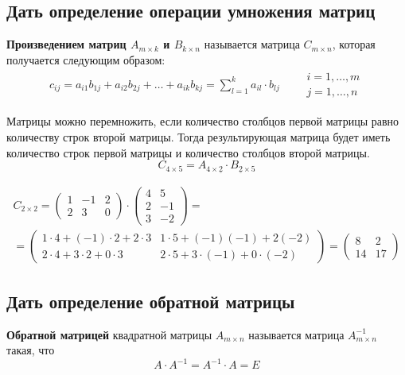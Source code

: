 \subsection{Дать определение операции умножения матриц}
\begin{definition*}
	\textbf{Произведением матриц $A_{m\times k}$ и $B_{k\times n}$} называется матрица $C_{m\times n}$, которая получается следующим образом:
	\begin{gather*}
		c_{ij} = a_{i1} b_{1j} + a_{i2}b_{2j} + \ldots + a_{ik} b_{kj} = \sum^k_{l=1} a_{il} \cdot b_{lj} \qquad \begin{array}{l} i = 1, \ldots , m \\ j = 1, \ldots , n \end{array}
	\end{gather*}
\end{definition*}
\begin{remark}
	Матрицы можно перемножить, если количество столбцов первой матрицы равно количеству строк второй матрицы. Тогда результирующая матрица будет иметь количество строк первой матрицы и количество столбцов второй матрицы.
	\[C_{4 \times 5} = A_{4 \times \underline{2}} \cdot B_{\underline{2} \times 5} \]
\end{remark}
\newpage
\begin{eg}
	\begin{gather*}
		C_{2\times 2} = \begin{pmatrix}
			1 & -1 & 2 \\
			2 & 3  & 0
		\end{pmatrix} \cdot \begin{pmatrix}
			4 & 5  \\
			2 & -1 \\
			3 & -2
		\end{pmatrix} = \\
		= \begin{pmatrix}
			1\cdot 4 + (-1) \cdot 2 + 2\cdot 3 & 1\cdot 5 + (-1)(-1) + 2(-2)          \\
			2\cdot 4 + 3\cdot 2 + 0\cdot 3     & 2\cdot 5 + 3\cdot (-1) + 0\cdot (-2)
		\end{pmatrix} = \begin{pmatrix}
			8  & 2  \\
			14 & 17
		\end{pmatrix}
	\end{gather*}
\end{eg}


\subsection{Дать определение обратной матрицы}
\begin{definition*}
	\textbf{Обратной матрицей} квадратной матрицы $A_{m\times n}$ называется матрица $A^{-1}_{m \times n}$ такая, что \[ A \cdot A^{-1} = A^{-1}\cdot A = E \]
\end{definition*}

